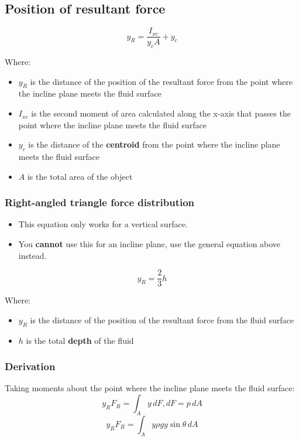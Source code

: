 \documentclass[11pt]{article}
\begin{document}
\subsection{Position of resultant force}
\label{sec:orgd5f6f93}
\[y_R = \frac{I_{xc}}{y_c A} + y_c\]

Where:
\begin{itemize}
\item \(y_R\) is the distance of the position of the resultant force from the point where the incline plane meets the fluid surface
\item \(I_{xc}\) is the second moment of area calculated along the x-axis that passes the point where the incline plane meets the fluid surface
\item \(y_c\) is the distance of the \textbf{centroid} from the point where the incline plane meets the fluid surface
\item \(A\) is the total area of the object
\end{itemize}

\subsubsection{Right-angled triangle force distribution}
\label{sec:org78460e5}
\begin{itemize}
\item This equation only works for a vertical surface.
\item You \textbf{cannot} use this for an incline plane, use the general equation above instead.
\end{itemize}

\[y_R = \frac{2}{3} h\]

Where:
\begin{itemize}
\item \(y_R\) is the distance of the position of the resultant force from the fluid surface
\item \(h\) is the total \textbf{depth} of the fluid
\end{itemize}

\newpage

\subsubsection{Derivation}
\label{sec:org62534e1}
Taking moments about the point where the incline plane meets the fluid surface:
\[y_R F_R = \int_A y \, dF, dF = p \, dA\]
\[y_R F_R = \int_A y \rho g y \sin \theta \, dA\]
\end{document}
